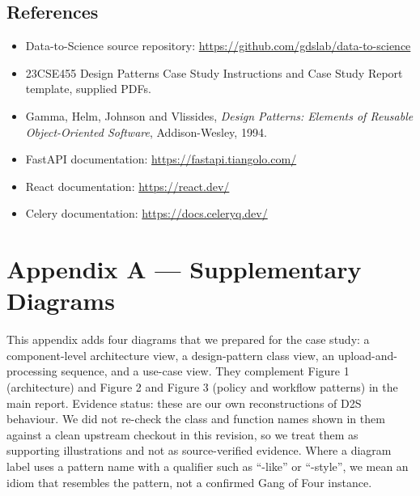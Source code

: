 \documentclass[11pt,a4paper]{article}
\begin{document}
\subsection{References}
\begin{itemize}[itemsep=2pt]
\item Data-to-Science source repository: \url{https://github.com/gdslab/data-to-science}
\item 23CSE455 Design Patterns Case Study Instructions and Case Study Report template, supplied PDFs.
\item Gamma, Helm, Johnson and Vlissides, \emph{Design Patterns: Elements of Reusable Object-Oriented Software}, Addison-Wesley, 1994.
\item FastAPI documentation: \url{https://fastapi.tiangolo.com/}
\item React documentation: \url{https://react.dev/}
\item Celery documentation: \url{https://docs.celeryq.dev/}
\end{itemize}

\clearpage
\appendix
\captionsetup{labelfont=bf}
\section*{Appendix A --- Supplementary Diagrams}
This appendix adds four diagrams that we prepared for the case study: a component-level architecture view, a design-pattern class view, an upload-and-processing sequence, and a use-case view. They complement Figure 1 (architecture) and Figure 2 and Figure 3 (policy and workflow patterns) in the main report. Evidence status: these are our own reconstructions of D2S behaviour. We did not re-check the class and function names shown in them against a clean upstream checkout in this revision, so we treat them as supporting illustrations and not as source-verified evidence. Where a diagram label uses a pattern name with a qualifier such as ``-like'' or ``-style'', we mean an idiom that resembles the pattern, not a confirmed Gang of Four instance.
\end{document}
